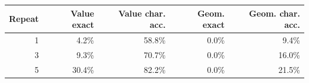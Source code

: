 \begin{tabular}{rrrrr}
\toprule
\textbf{Repeat} & \textbf{Value exact} & \textbf{Value char. acc.} & \textbf{Geom. exact} & \textbf{Geom. char. acc.} \\
\midrule
1 & 4.2\% & 58.8\% & 0.0\% & 9.4\% \\
3 & 9.3\% & 70.7\% & 0.0\% & 16.0\% \\
5 & 30.4\% & 82.2\% & 0.0\% & 21.5\% \\
\bottomrule
\end{tabular}
